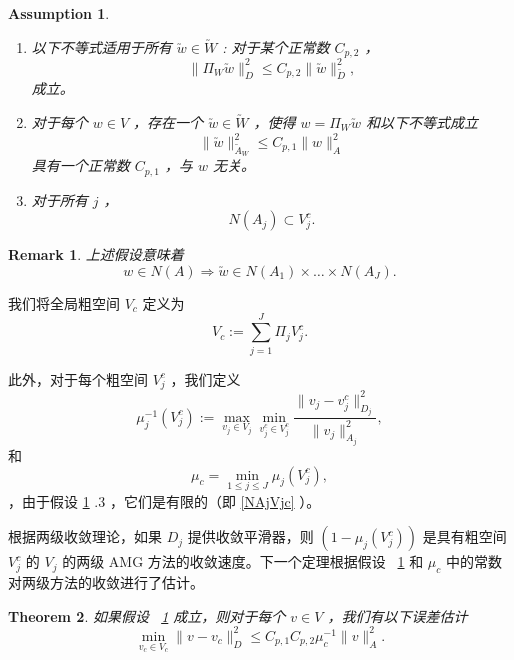 \documentclass[12pt]{acta_2011xz}
\newtheorem{theorem}{Theorem}[section]
\newtheorem{assumption}[equation]{Assumption}
\newtheorem{remark}[theorem]{Remark}
\begin{document}
   \begin{assumption}   \label{a:2level}       \quad    
   \begin{enumerate}

   \item   以下不等式适用于所有          $\utilde w\in \utilde W$          :
对于某个正常数          $C_{p, 2}$          ，    \begin{equation}\label{assm:D_j}
            \|\Pi_W \utilde w\|_D^2\le C_{p,2}\|\utilde w\|_{\utilde D}^2, 
        \end{equation}    成立。   \item   对于每个          $w\in V$          ，存在一个
         $\utilde w\in \utilde W$          ，使得          $w=\Pi_W\utilde w$          和以下不等式成立
   \begin{equation}\label{sum_Aj}
        \|\utilde w\|_{\utilde A_W}^2\le C_{p,1}\|w\|_A^2
\end{equation}    具有一个正常数          $C_{p, 1}$          ，与          $w$          无关。   \item   对于所有          $j$          ， 
   \begin{equation}
    \label{NAjVjc}
N(A_j)\subset V_j^c.    
  \end{equation}     \end{enumerate}     \end{assumption}     

   \begin{remark}上述假设意味着 
   $$
w\in N(A) \Rightarrow \utilde w\in N(A_1)\times\ldots \times N(A_J).
$$     \end{remark}     

我们将全局粗空间    $V_c$    定义为 
   \begin{equation}\label{V_c}
    V_c:=\sum_{j=1}^J\Pi_j V_j^c.
\end{equation}     

此外，对于每个粗空间    $V_j^c$    ，我们定义
   \begin{equation}\label{muj}
    \mu^{-1}_j(V_j^c):=\max_{v_j\in V_j}\min_{v_j^c\in V_j^c}\frac{\|v_j-v_j^c\|_{D_j}^2}{\|v_j\|_{A_j}^2},
\end{equation}    和 
   \begin{equation}
  \label{muc}
    \mu_c=\min_{1\le j\le J}\mu_j(V_j^c),
\end{equation}    ，由于假设    \ref{a:2level}    .3 ，它们是有限的（即    \eqref{NAjVjc}    ）。  

根据两级收敛理论，如果    $D_j$    提供收敛平滑器，则
   $(1-\mu_j(V_j^c))$    是具有粗空间    $V_j^c$    的    $V_j$    的两级 AMG 方法的收敛速度。下一个定理根据假设~    \ref{a:2level}    和    $\mu_c$    中的常数对两级方法的收敛进行了估计。
   \begin{theorem}   \label{thm:two-level}    如果假设~    \ref{a:2level}    成立，则对于每个    $v\in V$    ，我们有以下误差估计
   \begin{equation}
        \min_{v_c\in V_c}\|v-v_c\|_D^2 \le C_{p,1}C_{p,2}\mu_c^{-1}\|v\|_A^2.
    \end{equation}     \end{theorem}     
\end{document}
